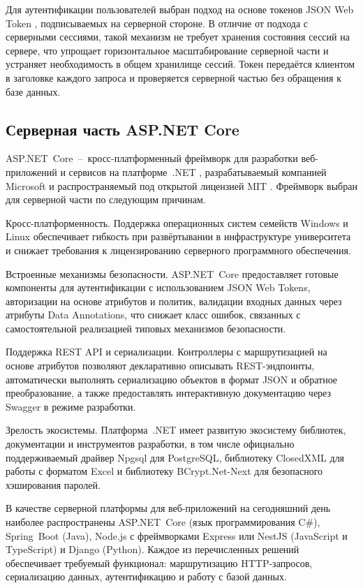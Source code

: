 Для аутентификации пользователей выбран подход на основе токенов JSON Web Token , подписываемых на серверной стороне.
В отличие от подхода с серверными сессиями, такой механизм не требует хранения состояния сессий на сервере, что упрощает горизонтальное масштабирование серверной части и устраняет необходимость в общем хранилище сессий.
Токен передаётся клиентом в заголовке  каждого запроса и проверяется серверной частью без обращения к базе данных.

\subsection{Серверная часть ASP.NET Core}

ASP.NET~Core~--~кросс-платформенный фреймворк для разработки веб-приложений и сервисов на платформе~.NET , разрабатываемый компанией Microsoft и распространяемый под открытой лицензией MIT .
Фреймворк выбран для серверной части по следующим причинам.

Кросс-платформенность.
Поддержка операционных систем семейств Windows и Linux обеспечивает гибкость при развёртывании в инфраструктуре университета и снижает требования к лицензированию серверного программного обеспечения.

Встроенные механизмы безопасности.
ASP.NET~Core предоставляет готовые компоненты для аутентификации с использованием JSON Web Tokens, авторизации на основе атрибутов и политик, валидации входных данных через атрибуты Data Annotations, что снижает класс ошибок, связанных с самостоятельной реализацией типовых механизмов безопасности.

Поддержка REST API и сериализации.
Контроллеры с маршрутизацией на основе атрибутов позволяют декларативно описывать REST-эндпоинты, автоматически выполнять сериализацию объектов в формат JSON и обратное преобразование, а также предоставлять интерактивную документацию через Swagger в режиме разработки.

Зрелость экосистемы.
Платформа~.NET имеет развитую экосистему библиотек, документации и инструментов разработки, в том числе официально поддерживаемый драйвер Npgsql для PostgreSQL, библиотеку ClosedXML для работы с форматом Excel и библиотеку BCrypt.Net-Next для безопасного хэширования паролей.

В качестве серверной платформы для веб-приложений на сегодняшний день наиболее распространены ASP.NET~Core (язык программирования C\#), Spring~Boot (Java), Node.js с фреймворками Express или NestJS (JavaScript и TypeScript) и Django (Python).
Каждое из перечисленных решений обеспечивает требуемый функционал: маршрутизацию HTTP-запросов, сериализацию данных, аутентификацию и работу с базой данных.

